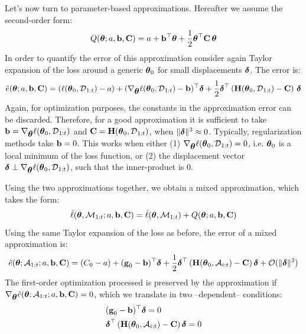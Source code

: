 \documentclass{article} %
\newcommand{\hessian}{\vH}
\newcommand{\memory}{\mathcal{M}}
\newcommand{\absent}{\mathcal{A}}
\begin{document}
Let's now turn to parameter-based approximations. Hereafter we assume the second-order form: 
\begin{equation}
\label{eq:second-order-approx}
    Q({\mbox{$\mbox{$\boldsymbol{\theta}$}$};  a, \mbox{$\mbox{$\mathbf{b}$}$}, \mbox{$\mbox{$\mathbf{C}$}$}}) = a + \mbox{$\mbox{$\mathbf{b}$}$}^\top\mbox{$\mbox{$\boldsymbol{\theta}$}$} + \frac{1}{2}\mbox{$\mbox{$\boldsymbol{\theta}$}$}^\top\mbox{\mbox{$\mbox{$\mathbf{C}$}$}}\,\mbox{$\mbox{$\boldsymbol{\theta}$}$}
\end{equation}
In order to quantify the error of this approximation consider again Taylor expansion of the loss around a generic $\mbox{$\mbox{$\boldsymbol{\theta}$}$}_0$ for small displacements $\mbox{$\mbox{$\boldsymbol{\delta}$}$}$. The error is: 
\begin{equation}
    \tilde{e}(\vparam;  a, \vb, \vC) = (\loss(\vparam_0, \data_{1:t}) - a) + (\nabla_{\vparam}\loss(\vparam_0, \data_{1:t}) - \vb)^\top\vdelta + \frac{1}{2}\vdelta^\top \rnd{\hessian(\vparam_0, \data_{1:t}) - \vC}\,\vdelta
\end{equation}
Again, for optimization purposes, the constants in the approximation error can be discarded. Therefore, for a good approximation it is sufficient to take $\mbox{$\mbox{$\mathbf{b}$}$} = \nabla_{\mbox{$\mbox{$\boldsymbol{\theta}$}$}}\ell(\mbox{$\mbox{$\boldsymbol{\theta}$}$}_0, \mbox{${\cal D}$}_{1:t})$ and $\vC = \hessian(\vparam_0, \data_{1:t})$, when $\|\mbox{$\mbox{$\boldsymbol{\delta}$}$}\|^3 \approx 0$.  Typically, regularization methods take $\mbox{$\mbox{$\mathbf{b}$}$} = 0$. This works when either (1)  $\nabla_{\mbox{$\mbox{$\boldsymbol{\theta}$}$}}\ell(\mbox{$\mbox{$\boldsymbol{\theta}$}$}_0, \mbox{${\cal D}$}_{1:t}) = 0$, i.e. $\mbox{$\mbox{$\boldsymbol{\theta}$}$}_0$ is a local minimum of the loss function, or (2) the displacement vector $\mbox{$\mbox{$\boldsymbol{\delta}$}$} \perp \nabla_{\mbox{$\mbox{$\boldsymbol{\theta}$}$}}\ell(\mbox{$\mbox{$\boldsymbol{\theta}$}$}_0, \mbox{${\cal D}$}_{1:t})$, such that the inner-product is $0$. 

Using the two approximations together, we obtain a mixed approximation, which takes the form:
\begin{equation}
    \hat{\loss}(\vparam, \memory_{1:t};a, \vb, \vC) = \hat{\loss}({\vparam, \memory_{1:t}}) + Q({\vparam;  a, \vb, \vC})
\end{equation}
Using the same Taylor expansion of the loss as before, the error of a mixed approximation is: 
\begin{equation}
    \tilde{e}(\vparam; \absent_{1:t}; a, \vb, \vC) = (C_0-a) + (\vg_0-\vb)^\top \vdelta + \frac{1}{2}\vdelta^\top \rnd{\hessian(\vparam_0, \absent_{i:t})-\vC}\vdelta + \mathcal{O}(\|\vdelta\|^3)
\end{equation}
The first-order optimization processed is preserved by the approximation if $\nabla_{\vparam}\tilde{e}(\vparam; \absent_{1:t}; a, \vb, \vC) = 0$, which we translate in two --dependent-- conditions:
\begin{align}
\label{eq:conditions-1}
    &(\vg_0-\vb)^\top \vdelta = 0\\
\label{eq:conditions-2}
    &\vdelta^\top \rnd{\hessian(\vparam_0, \absent_{i:t})-\vC}\vdelta = 0
\end{align}
\end{document}
